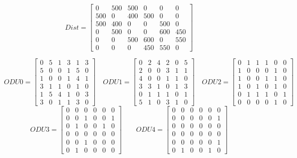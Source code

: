 \[
Dist=
  \begin{bmatrix}
    0 & 500 & 500 & 0 & 0 & 0 \\
    500 & 0 & 400 & 500 & 0 & 0 \\
    500 & 400 & 0 & 0 & 500 & 0 \\
    0 & 500 & 0 & 0 & 600 & 450 \\
    0 & 0 & 500 & 600 & 0 & 550 \\
    0 & 0 & 0 & 450 & 550 & 0
  \end{bmatrix}
\]

\[
ODU0=
  \begin{bmatrix}
    0 & 5 & 1 & 3 & 1 & 3 \\
    5 & 0 & 0 & 1 & 5 & 0 \\
    1 & 0 & 0 & 1 & 4 & 1 \\
    3 & 1 & 1 & 0 & 1 & 0 \\
    1 & 5 & 4 & 1 & 0 & 3 \\
    3 & 0 & 1 & 1 & 3 & 0
  \end{bmatrix}
\quad ODU1=
  \begin{bmatrix}
    0 & 2 & 4 & 2 & 0 & 5 \\
    2 & 0 & 0 & 3 & 1 & 1 \\
    4 & 0 & 0 & 1 & 1 & 0 \\
    3 & 3 & 1 & 0 & 1 & 3 \\
    0 & 1 & 1 & 1 & 0 & 1 \\
    5 & 1 & 0 & 3 & 1 & 0
  \end{bmatrix}
\quad ODU2=
  \begin{bmatrix}
    0 & 1 & 1 & 1 & 0 & 0 \\
    1 & 0 & 0 & 0 & 1 & 0 \\
    1 & 0 & 0 & 1 & 1 & 0 \\
    1 & 0 & 1 & 0 & 1 & 0 \\
    0 & 1 & 1 & 1 & 0 & 1 \\
    0 & 0 & 0 & 0 & 1 & 0
  \end{bmatrix}
\]
\[
ODU3=
  \begin{bmatrix}
    0 & 0 & 0 & 0 & 0 & 0 \\
    0 & 0 & 1 & 0 & 0 & 1 \\
    0 & 1 & 0 & 0 & 1 & 0 \\
    0 & 0 & 0 & 0 & 0 & 0 \\
    0 & 0 & 1 & 0 & 0 & 0 \\
    0 & 1 & 0 & 0 & 0 & 0
  \end{bmatrix}
\qquad ODU4=
  \begin{bmatrix}
    0 & 0 & 0 & 0 & 0 & 0 \\
    0 & 0 & 0 & 0 & 0 & 1 \\
    0 & 0 & 0 & 0 & 0 & 0 \\
    0 & 0 & 0 & 0 & 0 & 0 \\
    0 & 0 & 0 & 0 & 0 & 1 \\
    0 & 1 & 0 & 0 & 1 & 0
  \end{bmatrix}
\]

